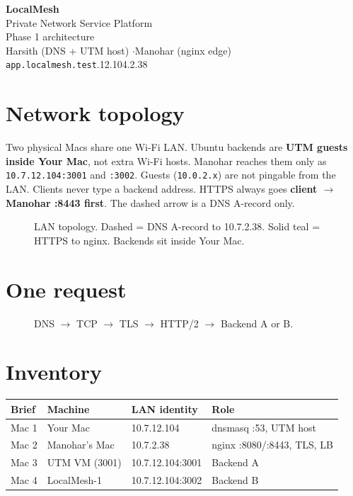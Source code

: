 \documentclass[11pt,a4paper]{article}
\begin{document}
\begin{center}
{\bfseries\Huge\color{lmNavy} LocalMesh}\\[3pt]
{\large Private Network Service Platform}\\[1pt]
{\color{lmTeal} Phase 1 architecture}\\[6pt]
{\small Harsith (DNS + UTM host) \quad$\cdot$\quad Manohar (nginx edge)}\\
{\small \texttt{app.localmesh.test}.12.104.2.38}
\end{center}

\section{Network topology}
Two physical Macs share one Wi-Fi LAN. Ubuntu backends are \textbf{UTM guests inside Your Mac}, not extra Wi-Fi hosts. Manohar reaches them only as \texttt{10.7.12.104:3001} and \texttt{:3002}. Guests (\texttt{10.0.2.x}) are not pingable from the LAN. Clients never type a backend address. HTTPS always goes \textbf{client $\to$ Manohar :8443 first}. The dashed arrow is a DNS A-record only.

\begin{figure}[H]
\centering
\resizebox{\textwidth}{!}{\drawTopology}
\caption{LAN topology. Dashed = DNS A-record to 10.7.2.38. Solid teal = HTTPS to nginx. Backends sit inside Your Mac.}
\end{figure}

\section{One request}
\begin{figure}[H]
\centering
\resizebox{\textwidth}{!}{\drawRequestPath}
\caption{DNS $\to$ TCP $\to$ TLS $\to$ HTTP/2 $\to$ Backend A or B.}
\end{figure}

\section{Inventory}
{\small
\begin{tabular}{@{}llp{4.6cm}p{5.4cm}@{}}
\toprule
\textbf{Brief} & \textbf{Machine} & \textbf{LAN identity} & \textbf{Role} \\
\midrule
Mac 1 & Your Mac & 10.7.12.104 & dnsmasq :53, UTM host \\
Mac 2 & Manohar's Mac & 10.7.2.38 & nginx :8080/:8443, TLS, LB \\
Mac 3 & UTM VM (3001) & 10.7.12.104:3001 & Backend A \\
Mac 4 & LocalMesh-1 & 10.7.12.104:3002 & Backend B \\
\bottomrule
\end{tabular}}
\end{document}
